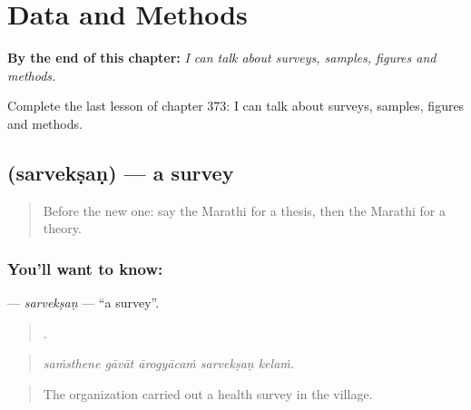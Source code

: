 
\chapter{Data and Methods}
\label{ch:mr-data-and-methods}

\begin{chapteropening}
\textbf{By the end of this chapter:} \emph{I can talk about surveys, samples, figures and methods.}

Complete the last lesson of chapter 373: I can talk about surveys, samples, figures and methods.
\end{chapteropening}

\section[\texorpdfstring{\mr{सर्वेक्षण} (sarvekṣaṇ)}{सर्वेक्षण (sarvekṣaṇ)}]{ (sarvekṣaṇ) — a survey}

\label{lesson:MR-C373-sarveksan}



\begin{quote}
Before the new one: say the Marathi for a thesis, then the Marathi for a theory.
\end{quote}

\subsection*{You'll want to know: }
\textbf{} — \emph{sarvekṣaṇ} — \textquotedblleft{}a survey\textquotedblright{}.

\begin{quote}
    .
\end{quote}

\begin{quote}
\emph{saṁsthene gāvāt ārogyācaṁ sarvekṣaṇ kelaṁ.}
\end{quote}

\begin{quote}
The organization carried out a health survey in the village.
\end{quote}

